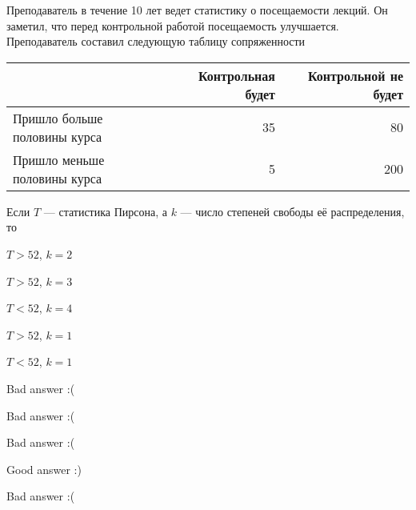 
\begin{question}
Преподаватель в течение 10 лет ведет статистику о посещаемости лекций.
Он заметил, что перед контрольной работой посещаемость улучшается.
Преподаватель составил следующую таблицу сопряженности

\vspace{5mm}
\begin{tabular}{lrr}
\toprule
& Контрольная будет & Контрольной не будет \\
\midrule
Пришло больше половины курса & 35 & 80 \\
Пришло меньше половины курса & 5 & 200 \\
\bottomrule
\end{tabular}
\vspace{5mm}

Если \(T\) --- статистика Пирсона, а \(k\) --- число степеней свободы её
распределения, то
\begin{answerlist}
  \item \(T>52\), \(k=2\)
  \item \(T>52\), \(k=3\)
  \item \(T<52\), \(k=4\)
  \item \(T>52\), \(k=1\)
  \item \(T<52\), \(k=1\)
\end{answerlist}
\end{question}

\begin{solution}
\begin{answerlist}
  \item Bad answer :(
  \item Bad answer :(
  \item Bad answer :(
  \item Good answer :)
  \item Bad answer :(
\end{answerlist}
\end{solution}

